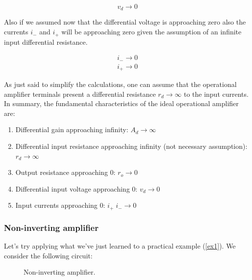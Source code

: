 \documentclass[../main.tex]{subfiles}
\begin{document}
\begin{equation}
	v_d \rightarrow 0
\end{equation} 

Also if we assumed now that the differential voltage is approaching zero also the currents $i_-$ and $i_+$ will be approaching zero given the assumption of an infinite input differential resistance.

\begin{equation}
\begin{aligned}
	i_- \rightarrow 0\\
	i_+ \rightarrow 0
\end{aligned}
\end{equation} 


As just said to simplify the calculations, one can assume that the operational amplifier terminals present a differential resistance $r_d \rightarrow \infty$ to the input currents. 
In summary, the fundamental characteristics of the ideal operational amplifier are:

\begin{enumerate}
	\item[\textbf{-}] Differential gain approaching infinity: $A_d \rightarrow \infty$ 
	\item[\textbf{-}] Differential input resistance approaching infinity (not necessary assumption): $r_d \rightarrow \infty$
	\item[\textbf{-}]Output resistance approaching 0: $r_o \rightarrow 0$
	\item[\textbf{-}]Differential input voltage approaching 0: $v_d \rightarrow 0$
	\item[\textbf{-}]Input currents approaching 0: $i_+ \; i_- \rightarrow 0$
\end{enumerate}

\subsubsection{Non-inverting amplifier}

Let's try applying what we've just learned to a practical example (\autoref{ex1}). We consider the following circuit:

\begin{figure}[h]
\begin{center}
	

\caption{Non-inverting amplifier.}	
\label{ex1}
\end{center}	
\end{figure}
\end{document}
